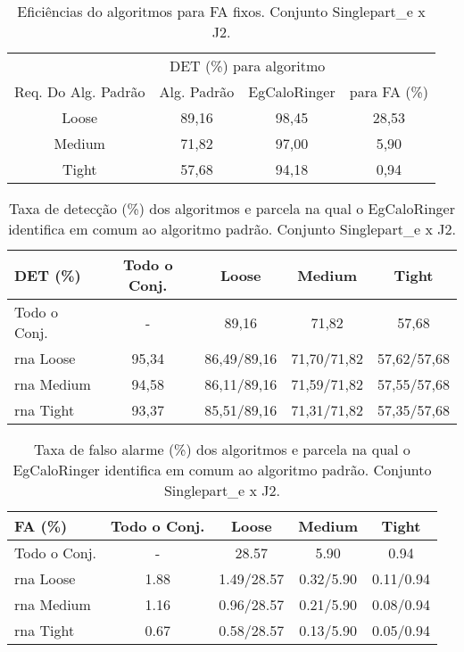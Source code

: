 \begin{table}[htb]
\centering
\begin{tabular}{cccc}
\hline
\hline
 & 
\multicolumn{2}{c}{DET (\%) para algoritmo} & 
\\
\cline{2-3}
\multirow{-2}{*}{Req. Do Alg. Padrão} & 
Alg. Padrão & 
EgCaloRinger & 
\multirow{-2}{*}{para FA (\%)} \\
\hline
Loose & 89,16 & 98,45 & 28,53 \\
Medium & 71,82 & 97,00 & 5,90 \\
Tight & 57,68 & 94,18 & 0,94 \\
\hline
\hline
\end{tabular}
\caption{Eficiências do algoritmos para FA fixos. Conjunto Singlepart\_e x J2.}
\label{tab:singlexj2_efic}
\end{table}

\begin{table}[htb]
\centering
\begin{tabular}{l cccc}
\hline
\hline
DET (\%)& Todo o Conj. & Loose & Medium & Tight \\
\hline
Todo o Conj. &  - & 89,16 & 71,82 & 57,68 \\
\hline
\gls{rna} Loose & 95,34 & 86,49/89,16 & 71,70/71,82 & 57,62/57,68 \\
\hline
\gls{rna} Medium & 94,58  & 86,11/89,16 & 71,59/71,82 & 57,55/57,68 \\
\hline
\gls{rna} Tight &  93,37 & 85,51/89,16 &  71,31/71,82 & 57,35/57,68 \\
\hline
\hline
\end{tabular}
\caption{Taxa de detecção (\%) dos algoritmos e parcela na qual o EgCaloRinger
identifica em comum ao algoritmo padrão. Conjunto Singlepart\_e x J2.}
\label{tab:singlexj2_efic_det}
\end{table}

\begin{table}[htb]
\centering
\begin{tabular}{l cccc}
\hline
\hline
FA (\%)& Todo o Conj. & Loose & Medium & Tight \\
\hline
Todo o Conj. & - & 28.57 & 5.90 &  0.94 \\
\gls{rna} Loose  & 1.88  & 1.49/28.57 & 0.32/5.90 & 0.11/0.94 \\
\gls{rna} Medium & 1.16  & 0.96/28.57 & 0.21/5.90 & 0.08/0.94 \\
\gls{rna} Tight  & 0.67  & 0.58/28.57 & 0.13/5.90 & 0.05/0.94 \\
\hline
\hline
\end{tabular}
\caption{Taxa de falso alarme (\%) dos algoritmos e parcela na qual o EgCaloRinger
identifica em comum ao algoritmo padrão. Conjunto Singlepart\_e x J2.}
\label{tab:singlexj2_fa_det}
\end{table}

